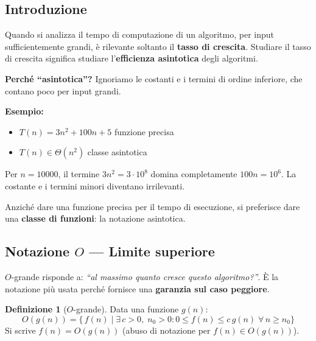 \documentclass[a4paper, 11pt]{article}
\theoremstyle{definition}
\newtheorem{definizione}{Definizione}[section]
\theoremstyle{remark}
\theoremstyle{remark}
\newenvironment{nota}{%
	\begin{tcolorbox}[
		colback=codebg,
		colframe=primary,
		fonttitle=\bfseries,
		title=Nota,
		left=6pt, right=6pt, top=4pt, bottom=4pt
		]
	}{%
	\end{tcolorbox}
}
\begin{document}
	\subsection{Introduzione}
	
	Quando si analizza il tempo di computazione di un algoritmo, per input
	sufficientemente grandi, è rilevante soltanto il \textbf{tasso di crescita}.
	Studiare il tasso di crescita significa studiare
	l'\textbf{efficienza asintotica} degli algoritmi.
	
	\begin{nota}
		\textbf{Perché ``asintotica''?} Ignoriamo le costanti e i termini
		di ordine inferiore, che contano poco per input grandi.
		
		\textbf{Esempio:}
		\begin{itemize}
			\item $T(n) = 3n^2 + 100n + 5$ \quad funzione precisa
			\item $T(n) \in \Theta(n^2)$ \quad classe asintotica
		\end{itemize}
		Per $n = 10000$, il termine $3n^2 = 3\cdot10^8$ domina
		completamente $100n = 10^6$. La costante e i termini minori
		diventano irrilevanti.
	\end{nota}
	
	Anziché dare una funzione precisa per il tempo di esecuzione,
	si preferisce dare una \textbf{classe di funzioni}: la notazione asintotica.
	
	\subsection{Notazione \texorpdfstring{$O$}{O} — Limite superiore}
	
	\begin{softnote}
		$O$-grande risponde a: \textit{``al massimo quanto cresce questo
			algoritmo?''}. È la notazione più usata perché fornisce una
		\textbf{garanzia sul caso peggiore}.
	\end{softnote}
	
	\begin{definizione}[$O$-grande]
		Data una funzione $g(n)$:
		\[
		O(g(n)) = \bigl\{\,f(n) \mid \exists\,c>0,\;n_0>0 :
		0 \le f(n) \le c\,g(n) \;\forall\,n \ge n_0\bigr\}
		\]
		Si scrive $f(n) = O(g(n))$ (abuso di notazione per
		$f(n) \in O(g(n))$).
	\end{definizione}
	
\end{document}
